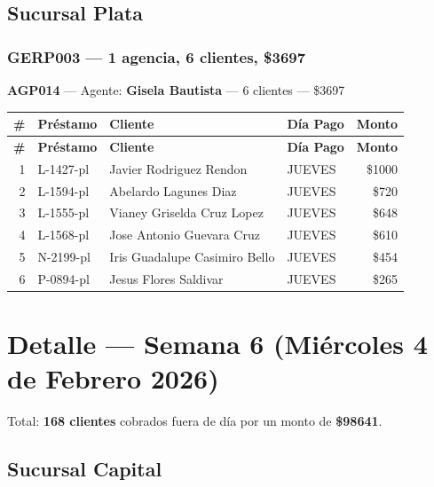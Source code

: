 \documentclass[11pt,a4paper]{article}
\newcommand{\money}[1]{\$\num{#1}}
\begin{document}
\subsection{Sucursal Plata}

\subsubsection{GERP003 --- 1 agencia, 6 clientes, \money{3697}}

\noindent\textbf{AGP014} --- Agente: \textbf{Gisela Bautista} --- 6 clientes --- \money{3697}


\begin{center}
\renewcommand{\arraystretch}{1.1}
\footnotesize
\begin{longtable}{rlp{6.5cm}lr}
\toprule
\textbf{\#} & \textbf{Pr\'estamo} & \textbf{Cliente} & \textbf{D\'ia Pago} & \textbf{Monto} \\
\midrule
\endfirsthead
\toprule
\textbf{\#} & \textbf{Pr\'estamo} & \textbf{Cliente} & \textbf{D\'ia Pago} & \textbf{Monto} \\
\midrule
\endhead
1 & L-1427-pl & Javier Rodriguez Rendon & JUEVES & \money{1000} \\
2 & L-1594-pl & Abelardo Lagunes Diaz & JUEVES & \money{720} \\
3 & L-1555-pl & Vianey Griselda Cruz Lopez & JUEVES & \money{648} \\
4 & L-1568-pl & Jose Antonio Guevara Cruz & JUEVES & \money{610} \\
5 & N-2199-pl & Iris Guadalupe Casimiro Bello & JUEVES & \money{454} \\
6 & P-0894-pl & Jesus Flores Saldivar & JUEVES & \money{265} \\

\bottomrule
\end{longtable}
\end{center}
\newpage
\section{Detalle --- Semana 6 (Mi\'ercoles 4 de Febrero 2026)}

Total: \textbf{168 clientes} cobrados fuera de d\'ia por un monto de \textbf{\money{98641}}.

\subsection{Sucursal Capital}
\end{document}
